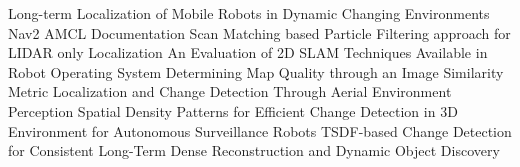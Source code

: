 Long-term Localization of Mobile Robots in Dynamic Changing Environments
 Nav2 AMCL Documentation
 Scan Matching based Particle Filtering approach for LIDAR only Localization
 An Evaluation of 2D SLAM Techniques Available in Robot Operating System
 Determining Map Quality through an Image Similarity Metric
 Localization and Change Detection Through Aerial Environment Perception
 Spatial Density Patterns for Efficient Change Detection in 3D Environment for Autonomous Surveillance Robots
 TSDF-based Change Detection for Consistent Long-Term Dense Reconstruction and Dynamic Object Discovery